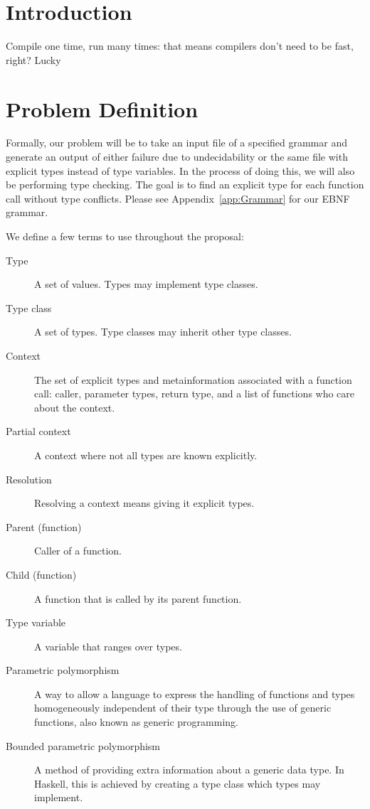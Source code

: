 \documentclass{acm_proc_article-sp}
\begin{document}


\section{Introduction}


Compile one time, run many times: that means compilers don't need to
be fast, right? Lucky

\section{Problem Definition}
\label{sec:problem}

Formally, our problem will be to take an input file of a specified grammar and
generate an output of either failure due to undecidability or the same file
with explicit types instead of type variables. In the process of doing this, we
will also be performing type checking. The goal is to find an explicit type for
each function call without type conflicts. Please see Appendix~\ref{app:Grammar}
for our EBNF grammar.

We define a few terms to use throughout the proposal:
\begin{description}
	\item[Type] A set of values. Types may implement type classes.
	\item[Type class] A set of types. Type classes may inherit other type classes.
	\item[Context] The set of explicit types and metainformation associated
		with a function call: caller, parameter types, return type,
		and a list of functions who care about the context.
	\item[Partial context] A context where not all types are known explicitly.
	\item[Resolution] Resolving a context means giving it explicit types.
	\item[Parent (function)] Caller of a function.
	\item[Child (function)] A function that is called by its parent function.
	\item[Type variable] A variable that ranges over types.
	\item[Parametric polymorphism] A way to allow a language to express the
		handling of functions and types homogeneously independent of their type
		through the use of generic functions, also known as generic
		programming.
	\item[Bounded parametric polymorphism] A method of providing extra
		information about a generic data type. In Haskell, this is achieved by
		creating a type class which types may implement.
\end{description}
\end{document}
